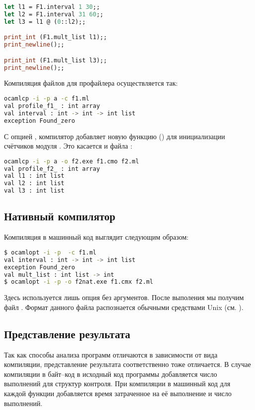 \begin{lstlisting}[language=OCaml]
let l1 = F1.interval 1 30;;
let l2 = F1.interval 31 60;;
let l3 = l1 @ (0::l2);;

print_int (F1.mult_list l1);;
print_newline();;

print_int (F1.mult_list l3);;
print_newline();;
\end{lstlisting}

Компиляция файлов для профайлера осуществляется так:

\begin{lstlisting}[language=Bash]
ocamlcp -i -p a -c f1.ml
val profile_f1_ : int array
val interval : int -> int -> int list
exception Found_zero
\end{lstlisting}

С опцией , компилятор добавляет новую функцию () 
для инициализации счётчиков модуля . Это касается и файла :

\begin{lstlisting}[language=Bash]
ocamlcp -i -p a -o f2.exe f1.cmo f2.ml
val profile_f2_ : int array
val l1 : int list
val l2 : int list
val l3 : int list
\end{lstlisting}

\subsection {Нативный компилятор}
\label{subsubsec:native_compiler}

Компиляция в машинный код выглядит следующим образом:

\begin{lstlisting}[language=Bash]
$ ocamlopt -i -p  -c f1.ml
val interval : int -> int -> int list
exception Found_zero
val mult_list : int list -> int
$ ocamlopt -i -p -o f2nat.exe f1.cmx f2.ml
\end{lstlisting}

Здесь используется лишь опция  без аргументов. После выполения 
 мы получим файл . Формат данного файла распознается 
обычными средствами Unix (см. ).

\subsection {Представление результата}
\label{subsec:presentation_of_the_results}

Так как способы анализа программ отличаются в зависимости от вида компиляции, 
представление результата соответственно тоже отличается. В случае компиляции в 
байт--код в исходный код программы добавляется число выполнений для структур 
контроля. При компиляции в машинный код для каждой функции добавляется время 
затраченное на её выполнение и число выполнений.

